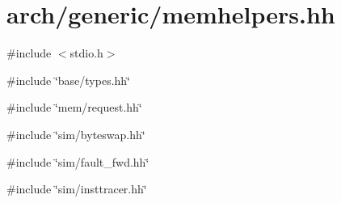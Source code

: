 \hypertarget{generic_2memhelpers_8hh}{
\section{arch/generic/memhelpers.hh}
\label{generic_2memhelpers_8hh}
}
{\ttfamily \#include $<$stdio.h$>$}\par
{\ttfamily \#include \char`\"{}base/types.hh\char`\"{}}\par
{\ttfamily \#include \char`\"{}mem/request.hh\char`\"{}}\par
{\ttfamily \#include \char`\"{}sim/byteswap.hh\char`\"{}}\par
{\ttfamily \#include \char`\"{}sim/fault\_\-fwd.hh\char`\"{}}\par
{\ttfamily \#include \char`\"{}sim/insttracer.hh\char`\"{}}\par
